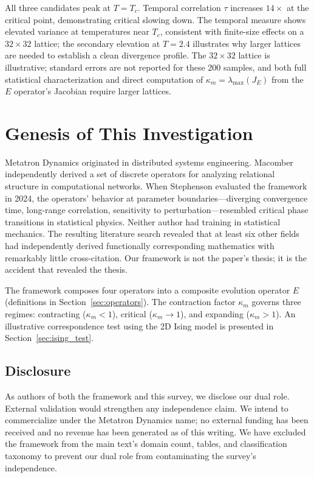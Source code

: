 \documentclass[11pt]{article}
\begin{document}
All three candidates peak at $T = T_c$. Temporal correlation $\tau$ increases $14\times$ at the critical point, demonstrating critical slowing down. The temporal measure shows elevated variance at temperatures near $T_c$, consistent with finite-size effects on a $32 \times 32$ lattice; the secondary elevation at $T = 2.4$ illustrates why larger lattices are needed to establish a clean divergence profile. The $32 \times 32$ lattice is illustrative; standard errors are not reported for these 200 samples, and both full statistical characterization and direct computation of $\kappa_m = \lambda_{\max}(J_E)$ from the $E$ operator's Jacobian require larger lattices.

\section{Genesis of This Investigation}
\label{sec:genesis}

Metatron Dynamics originated in distributed systems engineering. Macomber independently derived a set of discrete operators for analyzing relational structure in computational networks. When Stephenson evaluated the framework in 2024, the operators' behavior at parameter boundaries---diverging convergence time, long-range correlation, sensitivity to perturbation---resembled critical phase transitions in statistical physics. Neither author had training in statistical mechanics. The resulting literature search revealed that at least six other fields had independently derived functionally corresponding mathematics with remarkably little cross-citation. Our framework is not the paper's thesis; it is the accident that revealed the thesis.

The framework composes four operators into a composite evolution operator $E$ (definitions in Section~\ref{sec:operators}). The contraction factor $\kappa_m$ governs three regimes: contracting ($\kappa_m < 1$), critical ($\kappa_m \to 1$), and expanding ($\kappa_m > 1$). An illustrative correspondence test using the 2D Ising model is presented in Section~\ref{sec:ising_test}.

\subsection*{Disclosure}

As authors of both the framework and this survey, we disclose our dual role. External validation would strengthen any independence claim. We intend to commercialize under the Metatron Dynamics name; no external funding has been received and no revenue has been generated as of this writing. We have excluded the framework from the main text's domain count, tables, and classification taxonomy to prevent our dual role from contaminating the survey's independence.
\end{document}
